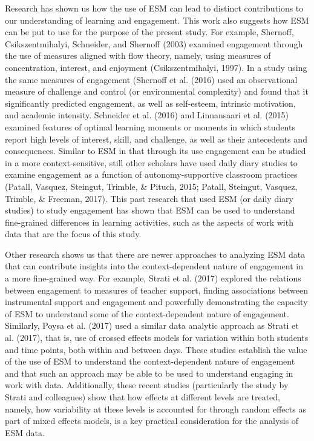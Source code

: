 \documentclass[]{book}
\theoremstyle{definition}
\theoremstyle{definition}
\theoremstyle{definition}
\theoremstyle{remark}
\begin{document}
Research has shown us how the use of ESM can lead to distinct
contributions to our understanding of learning and engagement. This work
also suggests how ESM can be put to use for the purpose of the present
study. For example, Shernoff, Csikszentmihalyi, Schneider, and Shernoff
(2003) examined engagement through the use of measures aligned with flow
theory, namely, using measures of concentration, interest, and enjoyment
(Csikszentmihalyi, 1997). In a study using the same measures of
engagement (Shernoff et al. (2016) used an observational measure of
challenge and control (or environmental complexity) and found that it
significantly predicted engagement, as well as self-esteem, intrinsic
motivation, and academic intensity. Schneider et al. (2016) and
Linnansaari et al. (2015) examined features of optimal learning moments
or moments in which students report high levels of interest, skill, and
challenge, as well as their antecedents and consequences. Similar to ESM
in that through its use engagement can be studied in a more
context-sensitive, still other scholars have used daily diary studies to
examine engagement as a function of autonomy-supportive classroom
practices (Patall, Vasquez, Steingut, Trimble, \& Pituch, 2015; Patall,
Steingut, Vasquez, Trimble, \& Freeman, 2017). This past research that
used ESM (or daily diary studies) to study engagement has shown that ESM
can be used to understand fine-grained differences in learning
activities, such as the aspects of work with data that are the focus of
this study.

Other research shows us that there are newer approaches to analyzing ESM
data that can contribute insights into the context-dependent nature of
engagement in a more fine-grained way. For example, Strati et al. (2017)
explored the relations between engagement to measures of teacher
support, finding associations between instrumental support and
engagement and powerfully demonstrating the capacity of ESM to
understand some of the context-dependent nature of engagement.
Similarly, Poysa et al. (2017) used a similar data analytic approach as
Strati et al. (2017), that is, use of crossed effects models for
variation within both students and time points, both within and between
days. These studies establish the value of the use of ESM to understand
the context-dependent nature of engagement and that such an approach may
be able to be used to understand engaging in work with data.
Additionally, these recent studies (particularly the study by Strati and
colleagues) show that how effects at different levels are treated,
namely, how variability at these levels is accounted for through random
effects as part of mixed effects models, is a key practical
consideration for the analysis of ESM data.
\end{document}
